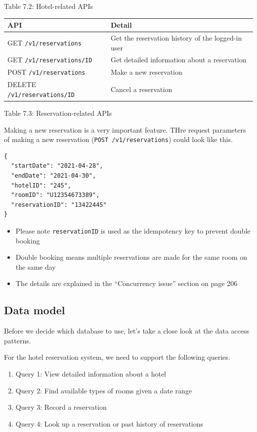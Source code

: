 \documentclass{report}
\theoremstyle{definition}
\let\oldsubsection\subsection
\renewcommand{\subsection}{\oldsubsection*}
\begin{document}
Table 7.2: Hotel-related APIs

\begin{tabular}{|p{6cm}|p{6cm}|}
\hline
API & Detail \\
\hline
GET \lstinline|/v1/reservations| & Get the reservation history of the logged-in user \\
\hline
GET \lstinline|/v1/reservations/ID| & Get detailed information about a reservation\\
\hline
POST \lstinline|/v1/reservations| & Make a new reservation\\
\hline
DELETE \lstinline|/v1/reservations/ID| & Cancel a reservation\\
\hline
\end{tabular}

Table 7.3: Reservation-related APIs

Making a new reservation  is a very important feature. THre request parameters of making a new reservation (\lstinline|POST /v1/reservations|) could look like this.

\begin{lstlisting}
{
  "startDate": "2021-04-28",
  "endDate": "2021-04-30",
  "hotelID": "245",
  "roomID": "U12354673389",
  "reservationID": "13422445"
}
\end{lstlisting}

\begin{itemize}
\item
Please note \lstinline|reservationID| is used as the idempotency key to prevent double booking
\item
Double booking means multiple reservations are made for the same room on the same day
\item
The details are explained in the ``Concurrency issue'' section on page 206
\end{itemize}

\subsection{Data model}

Before we decide which database to use, let's take a close look at the data access patterns.

For the hotel reservation system, we need to support the following queries.

\begin{enumerate}
\item
Query 1: View detailed information about a hotel
\item
Query 2: Find available types of rooms given a date range
\item
Query 3: Record a reservation
\item
Query 4: Look up a reservation or past history of reservations
\end{enumerate}
\end{document}
